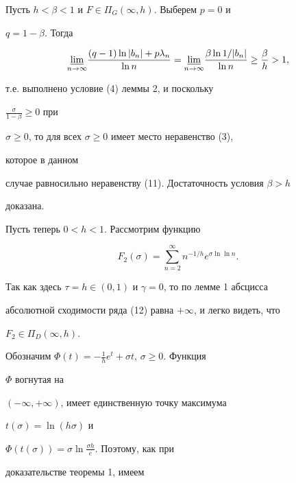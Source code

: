 \begin{pf} Пусть $h<\beta<1$ и $F\in\Pi_G(\infty,h)$. Выберем $p=0$ и 


$q=1-\beta$. Тогда 


$$ 


\underset{n\to\infty}{\varliminf} 


\frac{(q-1)\ln|b_n|+p\lambda_n}{\ln n}= 


\underset{n\to\infty}{\varliminf} 


\frac{\beta\ln 1/|b_n|}{\ln n}\ge\frac{\beta}{h}>1, 


$$ 


т.е. выполнено условие (4) леммы 2, и поскольку 


$\frac{\sigma}{1-\beta}\ge 0$ при 


$\sigma\ge 0$, то для всех $\sigma\ge 0$ имеет место неравенство (3), 


которое в данном 


случае равносильно неравенству (11). Достаточность условия $\beta>h$ 


доказана. 


 


Пусть теперь $0<h<1$. Рассмотрим функцию 


\begin{equation} 


F_2(\sigma)=\sum^\infty_{n=2}n^{-1/h}e^{\sigma\ln\ln n}. 


\end{equation} 


Так как здесь $\tau=h\in(0,1)$ и $\gamma=0$, то по лемме 1 абсцисса 


абсолютной сходимости ряда (12) равна $+\infty$, и легко видеть, что 


$F_2\in\Pi_D(\infty,h)$. 


 


Обозначим $\Phi(t)=-\frac{1}{h}e^t+\sigma t$, $\sigma\ge 0$. Функция 


$\Phi$ вогнутая на 


$(-\infty,+\infty)$, имеет единственную точку максимума 


$t(\sigma)=\ln(h\sigma)$ и 


$\Phi(t(\sigma))=\sigma\ln\frac{\sigma h}{e}$. Поэтому, как при 


доказательстве теоремы 1, имеем 


\begin{equation} 



\end{equation}
\end{pf}
